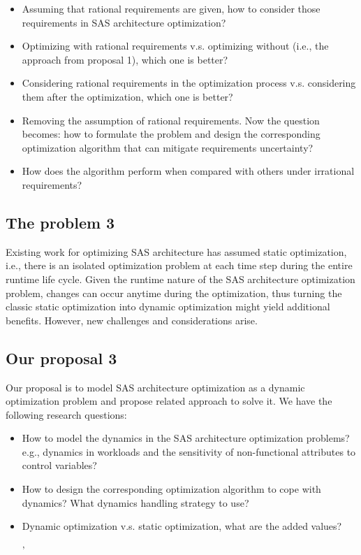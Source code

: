 \documentclass[DIV15,a4paper]{scrartcl}
\begin{document}
\begin{itemize}

\item Assuming that rational requirements are given, how to consider those requirements in SAS architecture optimization?

\item Optimizing with rational requirements v.s. optimizing without (i.e., the approach from proposal 1), which one is better?

\item Considering rational requirements in the optimization process v.s. considering them after the optimization, which one is better?

\item Removing the assumption of rational requirements. Now the question becomes: how to formulate the problem and design the corresponding optimization algorithm that can mitigate requirements uncertainty?

\item How does the algorithm perform when compared with others under irrational requirements?

\end{itemize}

\subsection{The problem 3}

Existing work for optimizing SAS architecture has assumed static optimization, i.e., there is an isolated optimization problem at each time step during the entire runtime life cycle. Given the runtime nature of the SAS architecture optimization problem, changes can occur anytime during the optimization, thus turning the classic static optimization into dynamic optimization might yield additional benefits. However, new challenges and considerations arise.

\subsection{Our proposal 3}

Our proposal is to model SAS architecture optimization as a dynamic optimization problem and propose related approach to solve it. We have the following research questions:

\begin{itemize}

\item How to model the dynamics in the SAS architecture optimization problems? e.g., dynamics in workloads and the sensitivity of non-functional attributes to control variables?

\item How to design the corresponding optimization algorithm to cope with dynamics? What dynamics handling strategy to use?

\item Dynamic optimization v.s. static optimization, what are the added values?

'\end{itemize}
\end{document}
